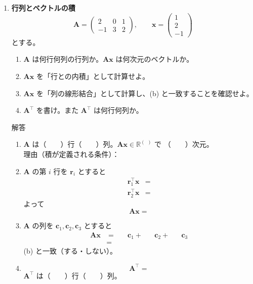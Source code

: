 \documentclass[a4paper,dvipdfmx]{jsarticle}
\newcommand{\提出期限}{2026年10月12日（月）}
\newcommand{\学籍番号}{0000000}
\newcommand{\氏名}{氏名を書く}
\newcommand{\提出日}{2026年10月12日}
\newenvironment{answer}{\begin{itembox}[l]{解答}}{\end{itembox}}
\begin{document}
\begin{enumerate}

  \item \textbf{行列とベクトルの積}\quad
    \begin{equation*}
      \bm{A} = \begin{pmatrix} 2 & 0 & 1 \\ -1 & 3 & 2 \end{pmatrix}, \qquad
      \bm{x} = \begin{pmatrix} 1 \\ 2 \\ -1 \end{pmatrix}
    \end{equation*}
    とする。
    \begin{enumerate}
      \item $\bm{A}$ は何行何列の行列か。$\bm{A}\bm{x}$ は何次元のベクトルか。
      \item $\bm{A}\bm{x}$ を「行との内積」として計算せよ。
      \item $\bm{A}\bm{x}$ を「列の線形結合」として計算し、(b) と一致することを確認せよ。
      \item $\bm{A}^\top$ を書け。また $\bm{A}^\top$ は何行何列か。
    \end{enumerate}
    \begin{answer}
      \begin{enumerate}
        \item $\bm{A}$ は（　　）行（　　）列。$\bm{A}\bm{x} \in \mathbb{R}^{(\ \ )}$ で
          （　　）次元。\\
          理由（積が定義される条件）：
        \item $\bm{A}$ の第 $i$ 行を $\bm{r}_i$ とすると
          \begin{align*}
            \bm{r}_1^\top \bm{x} &= \\
            \bm{r}_2^\top \bm{x} &=
          \end{align*}
          よって
          \begin{equation*}
            \bm{A}\bm{x} =
          \end{equation*}
        \item $\bm{A}$ の列を $\bm{c}_1, \bm{c}_2, \bm{c}_3$ とすると
          \begin{align*}
            \bm{A}\bm{x} &= \phantom{XX}\bm{c}_1 + \phantom{XX}\bm{c}_2 + \phantom{XX}\bm{c}_3 \\
                         &=
          \end{align*}
          (b) と一致（する・しない）。
        \item
          \begin{equation*}
            \bm{A}^\top =
          \end{equation*}
          $\bm{A}^\top$ は（　　）行（　　）列。
      \end{enumerate}
    \end{answer}


\end{enumerate}
\end{document}
